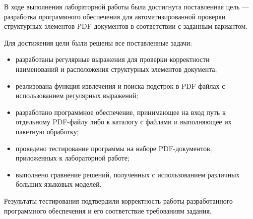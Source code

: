 
В ходе выполнения лабораторной работы была достигнута поставленная цель ---
разработка программного обеспечения для автоматизированной проверки
структурных элементов PDF-документов в соответствии с заданным вариантом.

Для достижения цели были решены все поставленные задачи:
\begin{itemize}
    \item разработаны регулярные выражения для проверки корректности
    наименований и расположения структурных элементов документа;
    \item реализована функция извлечения и поиска подстрок в PDF-файлах
    с использованием регулярных выражений;
    \item разработано программное обеспечение, принимающее на вход путь
    к отдельному PDF-файлу либо к каталогу с файлами и выполняющее их
    пакетную обработку;
    \item проведено тестирование программы на наборе PDF-документов,
    приложенных к лабораторной работе;
    \item выполнено сравнение решений, полученных с использованием
    различных больших языковых моделей.
\end{itemize}

Результаты тестирования подтвердили корректность работы разработанного
программного обеспечения и его соответствие требованиям задания.

